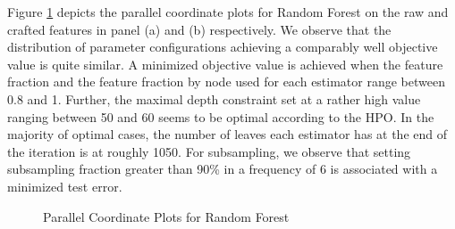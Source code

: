 Figure \ref{fig:RF_ParallelPlot} depicts the parallel coordinate plots for Random Forest on the raw and crafted features in panel (a) and (b) respectively. We observe that the distribution of parameter configurations achieving a comparably well objective value is quite similar. A minimized objective value is achieved when the feature fraction and the feature fraction by node used for each estimator range between 0.8 and 1. Further, the maximal depth constraint set at a rather high value ranging between 50 and 60 seems to be optimal according to the HPO. In the majority of optimal cases, the number of leaves each estimator has at the end of the iteration is at roughly 1050. For subsampling, we observe that setting subsampling fraction greater than 90\% in a frequency of 6 is associated with a minimized test error.
\begin{figure}[h]
	\centering
	\caption{Parallel Coordinate Plots for Random Forest}
	\label{fig:RF_ParallelPlot}
\end{figure}

